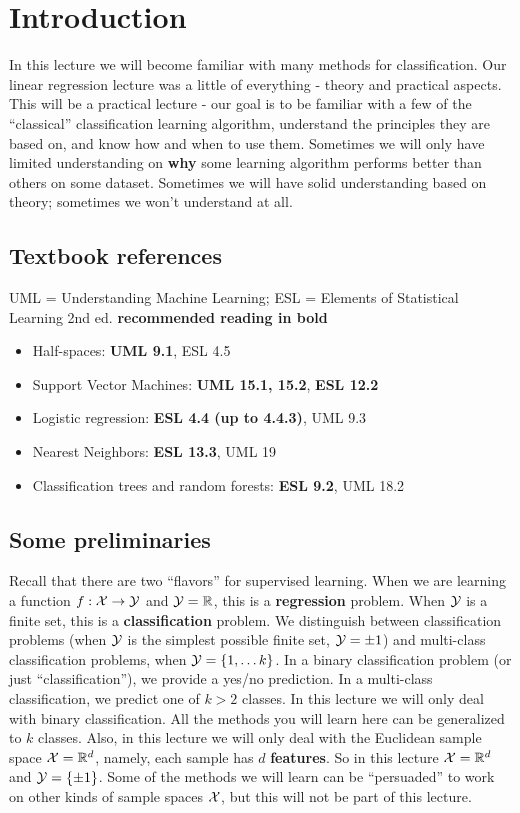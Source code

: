 
\section{Introduction}


In this lecture we will become familiar with many methods for classification.
Our linear regression lecture was a little of everything - theory and practical
aspects. This will be a practical lecture - our goal is to be familiar with a
few of the ``classical'' classification learning algorithm, understand the
principles they are based on, and know how and when to use them. Sometimes we
will only have limited understanding on {\bf why} some learning algorithm performs better than others
on some dataset. Sometimes we will have solid understanding based on theory; sometimes
we won't understand at all. 

\subsection{Textbook references}
UML = Understanding Machine Learning; ESL = Elements of Statistical Learning 2nd
ed. {\bf recommended reading in bold}

\begin{itemize}
  \item Half-spaces: {\bf UML 9.1}, ESL 4.5
  \item Support Vector Machines: {\bf UML 15.1, 15.2}, {\bf ESL 12.2}
  \item Logistic regression: {\bf ESL 4.4 (up to 4.4.3)}, UML 9.3
  \item Nearest Neighbors: {\bf ESL 13.3}, UML 19
  \item Classification trees and random forests: {\bf ESL 9.2}, UML 18.2
\end{itemize}

\subsection{Some preliminaries}

Recall that there are two ``flavors'' for supervised learning. When we are
learning a function $f:\mathcal{X}\to\mathcal{Y}$ and $\mathcal{Y}=\mathbb{R}$, this is a {\bf regression} problem.
When $\mathcal{Y}$ is a finite set, this is a {\bf classification} problem. We
distinguish between classification problems (when $\mathcal{Y}$
is the simplest possible finite set, $\mathcal{Y}={\pm 1}$) and multi-class
classification problems, when $\mathcal{Y}=\left\{ 1,\dots k \right\}$. In a binary classification
problem (or just ``classification''), we provide a  yes/no prediction. In a multi-class classification, we
predict one of $k>2$ classes. In this lecture we will only deal with
binary classification. All the methods you will learn here can be generalized to
$k$ classes. Also, in this lecture we will only deal with the Euclidean sample space
$\mathcal{X}=\mathbb{R}^d$, namely, each sample has $d$ {\bf features}. So in this lecture $\mathcal{X}=\mathbb{R}^d$ and $\mathcal{Y}=\left\{ \pm1 \right\}$.
Some of the methods we will learn can be ``persuaded'' to work on other kinds of
sample spaces $\mathcal{X}$, but this will not be part of this lecture. 



